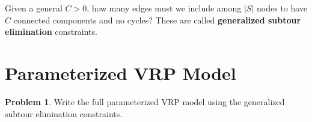 \documentclass[11pt]{article}
\theoremstyle{definition}
\newtheorem{problem}{Problem}
\begin{document}
\newpage

Given a general $C > 0$, how many edges must we include among $|S|$ nodes to have $C$ connected components and no cycles? These are called \textbf{generalized subtour elimination} constraints.
\vspace{1in}

\section{Parameterized VRP Model}

\begin{problem}
Write the full parameterized VRP model using the generalized subtour elimination constraints.
\end{problem}
\end{document}
